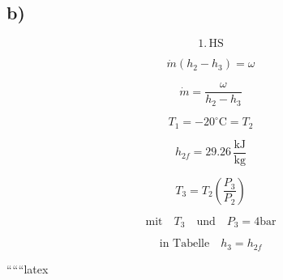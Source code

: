 

\subsection*{b)}

\begin{equation*}
    1. \, \text{HS}
\end{equation*}

\begin{equation*}
    \dot{m} (h_2 - h_3) = \omega
\end{equation*}

\begin{equation*}
    \dot{m} = \frac{\omega}{h_2 - h_3}
\end{equation*}

\begin{equation*}
    T_1 = -20^\circ \text{C} = T_2
\end{equation*}

\begin{equation*}
    h_{2f} = 29.26 \, \frac{\text{kJ}}{\text{kg}}
\end{equation*}

\begin{equation*}
    T_3 = T_2 \left( \frac{P_3}{P_2} \right)
\end{equation*}

\begin{equation*}
    \text{mit} \quad T_3 \quad \text{und} \quad P_3 = 4 \text{bar}
\end{equation*}

\begin{equation*}
    \text{in Tabelle} \quad h_3 = h_{2f}
\end{equation*}

``````latex